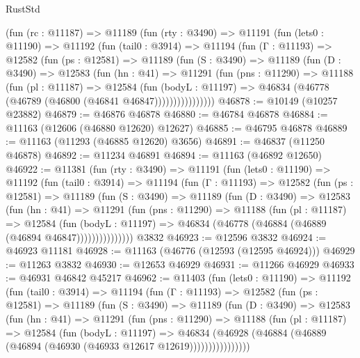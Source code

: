 \begin{lexlean}{RustStd}
\begin{coremodule}
    (fun (rc : @11187) =>
    @11189
      (fun (rty : @3490) =>
      @11191
        (fun (lets0 : @11190) =>
        @11192
          (fun (tail0 : @3914) =>
          @11194
            (fun (Γ : @11193) =>
            @12582
              (fun (ps : @12581) =>
              @11189
                (fun (S : @3490) =>
                @11189
                  (fun (D : @3490) =>
                  @12583
                    (fun (hn : @41) =>
                    @11291
                      (fun (pns : @11290) =>
                      @11188
                        (fun (pl : @11187) =>
                        @12584
                          (fun (bodyL : @11197) =>
                          @46834 (@46778 (@46789 (@46800 (@46841 @46847))))))))))))))))
@46878 := @10149 (@10257 @23882)
@46879 := @46876 @46878
@46880 := @46784 @46878
@46884 := @11163 (@12606 (@46880 @12620) @12627)
@46885 := @46795 @46878
@46889 := @11163 (@11293 (@46885 @12620) @3656)
@46891 := @46837 (@11250 @46878)
@46892 := @11234 @46891
@46894 := @11163 (@46892 @12650)
@46922 := @11381
    (fun (rty : @3490) =>
    @11191
      (fun (lets0 : @11190) =>
      @11192
        (fun (tail0 : @3914) =>
        @11194
          (fun (Γ : @11193) =>
          @12582
            (fun (ps : @12581) =>
            @11189
              (fun (S : @3490) =>
              @11189
                (fun (D : @3490) =>
                @12583
                  (fun (hn : @41) =>
                  @11291
                    (fun (pns : @11290) =>
                    @11188
                      (fun (pl : @11187) =>
                      @12584
                        (fun (bodyL : @11197) =>
                        @46834 (@46778 (@46884 (@46889 (@46894 @46847)))))))))))))))
    @3832
@46923 := @12596 @3832
@46924 := @46923 @11181
@46928 := @11163 (@46776 (@12593 (@12595 @46924)))
@46929 := @11263 @3832
@46930 := @12653 @46929
@46931 := @11266 @46929
@46933 := @46931 @46842 @45217
@46962 := @11403
    (fun (lets0 : @11190) =>
    @11192
      (fun (tail0 : @3914) =>
      @11194
        (fun (Γ : @11193) =>
        @12582
          (fun (ps : @12581) =>
          @11189
            (fun (S : @3490) =>
            @11189
              (fun (D : @3490) =>
              @12583
                (fun (hn : @41) =>
                @11291
                  (fun (pns : @11290) =>
                  @11188
                    (fun (pl : @11187) =>
                    @12584
                      (fun (bodyL : @11197) =>
                      @46834
                        (@46928
                          (@46884 (@46889 (@46894 (@46930 (@46933 @12617 @12619))))))))))))))))

\end{coremodule}
\end{lexlean}
